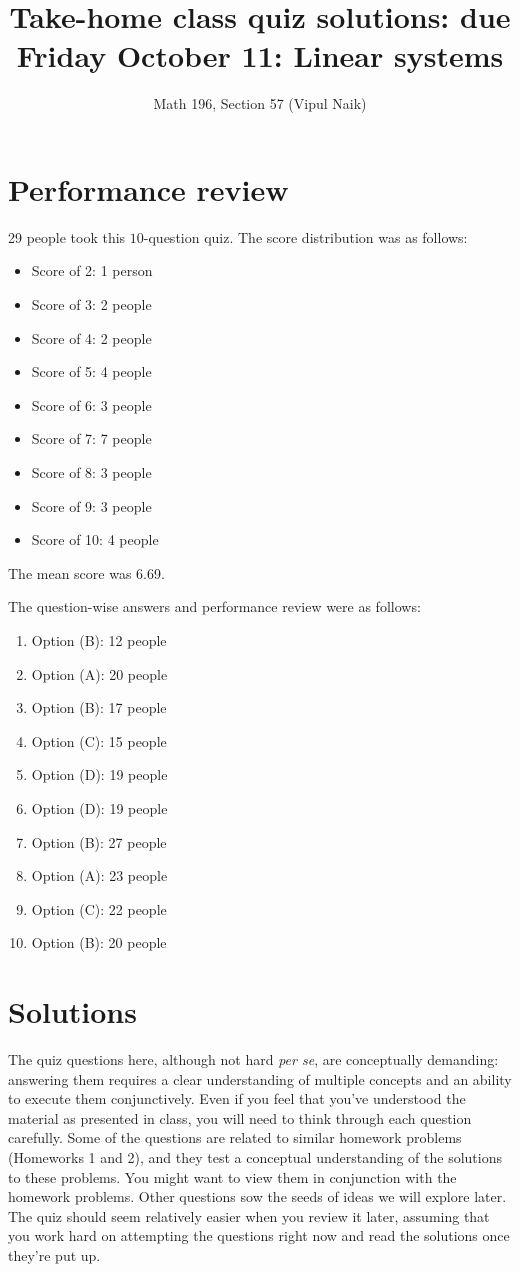 \documentclass[10pt]{amsart}
\title{Take-home class quiz solutions: due Friday October 11: Linear systems}
\author{Math 196, Section 57 (Vipul Naik)}
\begin{document}
\maketitle

\section{Performance review}

29 people took this $10$-question quiz. The score distribution was
as follows:

\begin{itemize}
\item Score of 2: 1 person
\item Score of 3: 2 people
\item Score of 4: 2 people
\item Score of 5: 4 people
\item Score of 6: 3 people
\item Score of 7: 7 people
\item Score of 8: 3 people
\item Score of 9: 3 people
\item Score of 10: 4 people
\end{itemize}

The mean score was 6.69.

The question-wise answers and performance review were as follows:

\begin{enumerate}
\item Option (B): 12 people
\item Option (A): 20 people
\item Option (B): 17 people
\item Option (C): 15 people
\item Option (D): 19 people
\item Option (D): 19 people
\item Option (B): 27 people
\item Option (A): 23 people
\item Option (C): 22 people
\item Option (B): 20 people
\end{enumerate}

\section{Solutions}

The quiz questions here, although not hard {\em per se}, are
conceptually demanding: answering them requires a clear understanding
of multiple concepts and an ability to execute them
conjunctively. Even if you feel that you've understood the material as
presented in class, you will need to think through each question
carefully. Some of the questions are related to similar homework
problems (Homeworks 1 and 2), and they test a conceptual understanding
of the solutions to these problems. You might want to view them in
conjunction with the homework problems. Other questions sow the seeds
of ideas we will explore later. The quiz should seem relatively easier
when you review it later, assuming that you work hard on attempting
the questions right now and read the solutions once they're put up.
\end{document}
